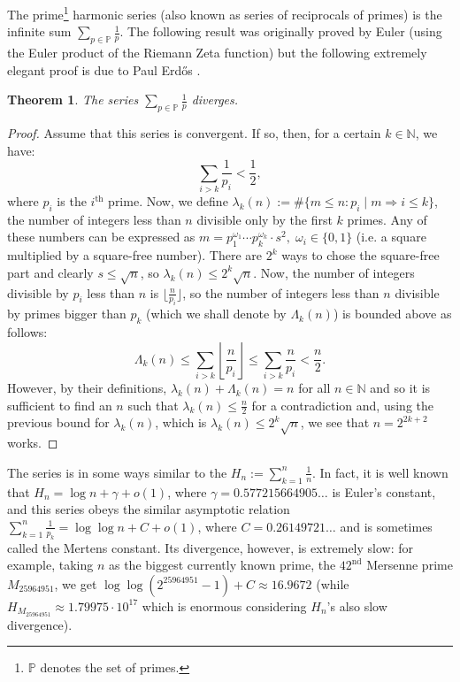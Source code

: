 \documentclass[12pt]{article}
\newtheorem*{thm}{Theorem}
\newcommand{\bbP}{\mathbb{P}}
\newcommand{\bbN}{\mathbb{N}}
\renewcommand{\div}{\!\mid\!}
\begin{document}

The prime\footnote{\(\bbP\) denotes the set of 
primes.} harmonic series (also known as series of reciprocals of primes) is the infinite sum \(\sum_{p\in\bbP}\frac{1}{p}\). The following result was originally proved by Euler (using the Euler product of the Riemann Zeta function) but the following extremely elegant proof is due to Paul Erd\H{o}s \cite{Er}.

\begin{thm}
The series \( \sum_{p\in\bbP}\frac{1}{p} \) diverges.
\end{thm}
\begin{proof}
Assume that this series is convergent. If so, then, for a certain \( 
k\in\bbN \), we have:
\[ \sum_{i > k}\frac{1}{p_i} < \frac{1}{2}, \]
where \(p_i\) is the \(i^{\mathrm{th}}\) prime. Now, we define \( 
\lambda_k(n) := \#\{ m\leq n : p_i \div m \Rightarrow i \leq k \} \), the 
number of integers less than \(n\) divisible only by the first \(k\) 
primes. Any of these numbers can be expressed as 
\(m = p_1^{\omega_1} \dotsm p_k^{\omega_k} \cdot s^2,\; 
\omega_i\in\{0,1\} \) (i.e. a square multiplied by a square-free number). There are \(2^k\) ways to chose the square-free part and clearly \(s\leq 
\sqrt{n}\), so \( \lambda_k(n) \leq 2^k \sqrt{n}\). Now, the number of integers divisible by \(p_i\) less than \(n\) is \(\bigl\lfloor\frac{n}{p_i}\bigr\rfloor\), so the number of integers less than \(n\) divisible by primes bigger than \(p_k\) (which we shall denote by \( \Lambda_k(n) \)) is bounded above as follows:
\[\Lambda_k(n) \leq \sum_{i>k}\left\lfloor\frac{n}{p_i}\right\rfloor \leq \sum_{i>k}\frac{n}{p_i} < \frac{n}{2}.\]
However, by their definitions, \(\lambda_k(n)+\Lambda_k(n) = n\) for all \(n\in\bbN\) and so it is sufficient to find an \(n\) such that \(\lambda_k(n)\leq\frac{n}{2}\) for a contradiction and, using the previous bound for \( \lambda_k(n) \), which is \( \lambda_k(n) \leq 2^k \sqrt{n}\), we see that \( n = 2^{2k+2} \) works.
\end{proof}

The series is in some ways similar to the  \(H_n := \sum_{k = 1}^n \frac{1}{n}\). In fact, it is well known that \(H_n = \log n + \gamma + o(1) \), where \(\gamma = 0.577215664905\dots\) is Euler's constant, and this series obeys the similar asymptotic relation \(\sum_{k=1}^n\frac{1}{p_k}= \log\log n + C + o(1)\), where \(C = 0.26149721\dots\) and is sometimes called the Mertens constant. Its divergence, however, is extremely slow: for example, taking \(n\) as the biggest currently known prime, the \( 42^{\mathrm{nd}} \) Mersenne prime \(M_{25964951}\), we get \(\log\log(2^{25964951} - 1) + C \approx 16.9672\) (while \(H_{M_{25964951}}\approx 1.79975\cdot 10^{17} \) which is enormous considering \(H_n\)'s also slow divergence).
\end{document}

